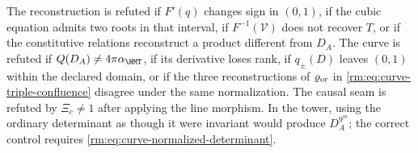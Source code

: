 \begin{falsifierbox}
The reconstruction is refuted if \(F'(q)\) changes sign in \((0,1)\), if the cubic equation admits two roots in that interval, if \(F^{-1}(\mathcal V)\) does not recover \(T\), or if the constitutive relations reconstruct a product different from \(D_A\). The curve is refuted if \(Q(D_A)\ne4\pi\alpha_{\HMT}\), if its derivative loses rank, if \(q_\pm(D)\) leaves \((0,1)\) within the declared domain, or if the three reconstructions of \(\varrho_{\rm or}\) in \cref{rm:eq:curve-triple-confluence} disagree under the same normalization. The causal seam is refuted by \(\Xi_c\ne1\) after applying the line morphism. In the tower, using the ordinary determinant as though it were invariant would produce \(D_A^{9^m}\); the correct control requires \cref{rm:eq:curve-normalized-determinant}.
\end{falsifierbox}
